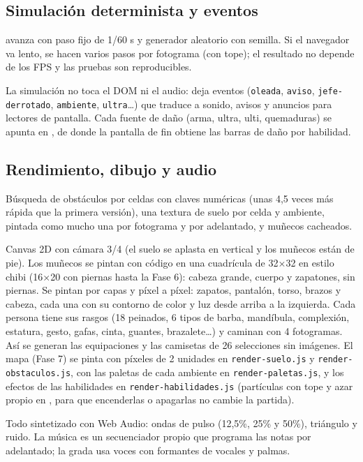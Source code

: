 \subsection{Simulación determinista y eventos}
 avanza con paso fijo de 1/60 s y generador aleatorio con semilla. Si el navegador va lento, se hacen varios pasos por fotograma (con tope); el resultado no depende de los FPS y las pruebas son reproducibles.

La simulación no toca el DOM ni el audio: deja eventos (\texttt{oleada}, \texttt{aviso}, \texttt{jefe-derrotado}, \texttt{ambiente}, \texttt{ultra}…) que  traduce a sonido, avisos y anuncios para lectores de pantalla. Cada fuente de daño (arma, ultra, ulti, quemaduras) se apunta en , de donde la pantalla de fin obtiene las barras de daño por habilidad.

\subsection{Rendimiento, dibujo y audio}
Búsqueda de obstáculos por celdas con claves numéricas (unas 4,5 veces más rápida que la primera versión), una textura de suelo por celda y ambiente, pintada como mucho una por fotograma y por adelantado, y muñecos cacheados.

Canvas 2D con cámara 3/4 (el suelo se aplasta en vertical y los muñecos están de pie). Los muñecos se pintan con código en una cuadrícula de 32×32 en estilo chibi (16×20 con piernas hasta la Fase 6): cabeza grande, cuerpo y zapatones, sin piernas. Se pintan por capas y píxel a píxel: zapatos, pantalón, torso, brazos y cabeza, cada una con su contorno de color y luz desde arriba a la izquierda. Cada persona tiene sus rasgos (18 peinados, 6 tipos de barba, mandíbula, complexión, estatura, gesto, gafas, cinta, guantes, brazalete…) y caminan con 4 fotogramas. Así se generan las equipaciones y las camisetas de 26 selecciones sin imágenes. El mapa (Fase 7) se pinta con píxeles de 2 unidades en \texttt{render-\allowbreak suelo.js} y \texttt{render-\allowbreak obstaculos.js}, con las paletas de cada ambiente en \texttt{render-\allowbreak paletas.js}, y los efectos de las habilidades en \texttt{render-\allowbreak habilidades.js} (partículas con tope y azar propio en , para que encenderlas o apagarlas no cambie la partida).

Todo sintetizado con Web Audio: ondas de pulso (12,5\%, 25\% y 50\%), triángulo y ruido. La música es un secuenciador propio que programa las notas por adelantado; la grada usa voces con formantes de vocales y palmas.

